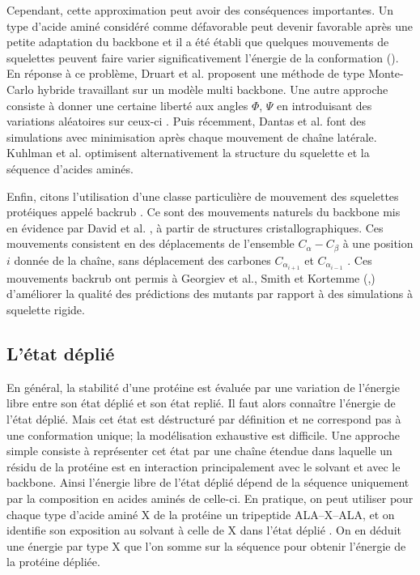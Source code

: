 Cependant, cette approximation peut avoir des conséquences importantes. Un type d'acide aminé considéré comme défavorable peut devenir favorable après une petite adaptation du backbone et il a été établi que quelques mouvements de squelettes peuvent faire varier significativement l'énergie de la conformation (\cite{Desjarlais99}).
En réponse à ce problème, Druart et al. \cite{Druart16} proposent une méthode de type Monte-Carlo hybride travaillant sur un modèle multi backbone. Une autre approche consiste à donner une certaine liberté aux angles $\Phi$, $\Psi$ en introduisant des variations aléatoires sur ceux-ci \cite{Desjarlais99}. Puis récemment, Dantas et al. \cite{Dantas07} font des simulations avec minimisation après chaque mouvement de chaîne latérale. Kuhlman et al. \cite{Kuhlman03}  optimisent alternativement la structure du squelette et la séquence d'acides aminés.

Enfin, citons l'utilisation d'une classe particulière de mouvement des squelettes protéiques appelé \og backrub \fg. Ce sont des mouvements naturels du backbone mis en évidence par David et al. \cite{Davis06}, à partir de structures cristallographiques. Ces mouvements consistent en des déplacements de l'ensemble $C_{\alpha}-C_{\beta}$ à une position $i$ donnée de la chaîne, sans déplacement des carbones $C_{\alpha_{i+1}}$ et $C_{\alpha_{i-1}}$ . Ces mouvements backrub ont permis à Georgiev et al., Smith et Kortemme (\cite{Georgiev08},\cite{Smith08}) d'améliorer la qualité des prédictions des mutants par rapport à des simulations à squelette rigide.

\subsection{L'état déplié }
\label{sub:deplie}
En général, la stabilité d'une protéine est évaluée par une variation de l'énergie libre entre son état déplié et son état replié. Il faut alors connaître l'énergie de l'état déplié. Mais cet état est déstructuré par définition et ne correspond pas à une conformation unique; la modélisation exhaustive est difficile. Une approche simple consiste à représenter cet état par une chaîne étendue dans laquelle un résidu de la protéine est en interaction principalement avec le solvant et avec le backbone. Ainsi l'énergie libre de l'état déplié dépend de la séquence uniquement par la composition en acides aminés de celle-ci. En pratique, on peut utiliser pour chaque type d'acide aminé X de la protéine  un tripeptide ALA--X--ALA, et on identifie son exposition au solvant à celle de X dans l'état déplié \cite{Dahiyat96}. On en déduit une énergie par type X que l'on somme sur la séquence pour obtenir l'énergie de la protéine dépliée. 

